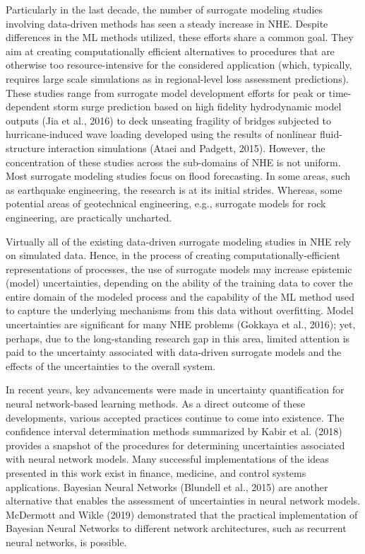 Particularly in the last decade, the number of surrogate modeling studies involving data-driven methods has seen a steady increase in NHE. Despite differences in the ML methods utilized, these efforts share a common goal. They aim at creating computationally efficient alternatives to procedures that are otherwise too resource-intensive for the considered application (which, typically, requires large scale simulations as in regional-level loss assessment predictions). These studies range from surrogate model development efforts for peak or time-dependent storm surge prediction based on high fidelity hydrodynamic model outputs (Jia et al., 2016) to deck unseating fragility of bridges subjected to hurricane-induced wave loading developed using the results of nonlinear fluid-structure interaction simulations (Ataei and Padgett, 2015). However, the concentration of these studies across the sub-domains of NHE is not uniform. Most surrogate modeling studies focus on flood forecasting. In some areas, such as earthquake engineering, the research is at its initial strides. Whereas, some potential areas of geotechnical engineering, e.g., surrogate models for rock engineering, are practically uncharted.

Virtually all of the existing data-driven surrogate modeling studies in NHE rely on simulated data. Hence, in the process of creating computationally-efficient representations of processes, the use of surrogate models may increase epistemic (model) uncertainties, depending on the ability of the training data to cover the entire domain of the modeled process and the capability of the ML method used to capture the underlying mechanisms from this data without overfitting. Model uncertainties are significant for many NHE problems (Gokkaya et al., 2016); yet, perhaps, due to the long-standing research gap in this area, limited attention is paid to the uncertainty associated with data-driven surrogate models and the effects of the uncertainties to the overall system.

In recent years, key advancements were made in uncertainty quantification for neural network-based learning methods. As a direct outcome of these developments, various accepted practices continue to come into existence. The confidence interval determination methods summarized by Kabir et al. (2018) provides a snapshot of the procedures for determining uncertainties associated with neural network models. Many successful implementations of the ideas presented in this work exist in finance, medicine, and control systems applications. Bayesian Neural Networks (Blundell et al., 2015) are another alternative that enables the assessment of uncertainties in neural network models. McDermott and Wikle (2019) demonstrated that the practical implementation of Bayesian Neural Networks to different network architectures, such as recurrent neural networks, is possible. 

